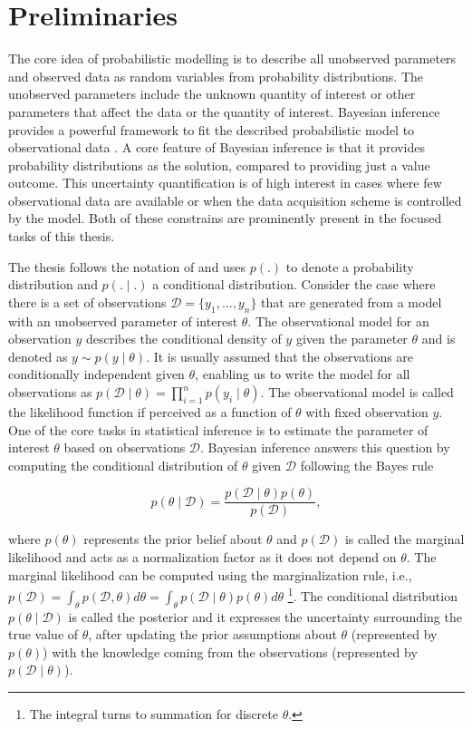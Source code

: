 \documentclass[dissertation,math,vertlayout,pdfa,colorlinks]{aaltoseries}
\newcommand{\bD}{\mathcal{D}}
\begin{document}
\section{Preliminaries}
The core idea of probabilistic modelling is to describe all unobserved parameters and observed data as random variables from probability distributions. The unobserved parameters include the unknown quantity of interest or other parameters that affect the data or the quantity of interest. Bayesian inference provides a powerful framework to fit the described probabilistic model to observational data \cite{Gelman2013}. A core feature of Bayesian inference is that it provides probability distributions as the solution, compared to providing just a value outcome. %
This uncertainty quantification is of high interest in cases where few observational data are available or when the data acquisition scheme is controlled by the model. Both of these constrains are prominently present in the focused tasks of this thesis.

The thesis follows the notation of \cite{Gelman2013} and uses $p(.)$ to denote a probability distribution and $p(.\mid.)$ a conditional distribution. Consider the case where there is a set of observations $\bD= \{y_1,\ldots,y_n\}$ that are generated from a model with an unobserved parameter of interest $\theta$. The observational model for an observation $y$ describes the conditional density of $y$ given the parameter $\theta$ and is denoted as $y \sim p(y \mid \theta)$. It is usually assumed that the observations are conditionally independent given $\theta$, enabling us to write the model for all observations as $p(\bD \mid \theta) =  \prod_{i=1}^{n} p(y_i \mid \theta)$. The observational model is called the likelihood function if perceived as a function of $\theta$ with fixed observation $y$. One of the core tasks in statistical inference is to estimate the parameter of interest $\theta$ based on observations $\bD$. %
Bayesian inference answers this question by computing the conditional distribution of $\theta$ given $\bD$ following the Bayes rule


\begin{equation}\label{Eq:Bayes}
p(\theta \mid \bD) = \frac{p(\bD \mid \theta)p(\theta)}{p(\bD)},
\end{equation}  

\noindent where $p(\theta)$ represents the prior belief about $\theta$ and $p(\bD)$ is called the marginal likelihood and acts as a normalization factor as it does not depend on $\theta$. The marginal likelihood can be computed using the marginalization rule, i.e., $p(\bD)= \int_{\theta} p(\bD, \theta)d\theta= \int_{\theta} p(\bD \mid \theta)p(\theta) d\theta$ \footnote{The integral turns to summation for discrete $\theta$.}. The conditional distribution $p(\theta \mid \bD)$ is called the posterior and it expresses the uncertainty surrounding the true value of $\theta$, after updating the prior assumptions about $\theta$ (represented by $p(\theta)$) with the knowledge coming from the observations (represented by $p(\bD \mid \theta)$).  
\end{document}
